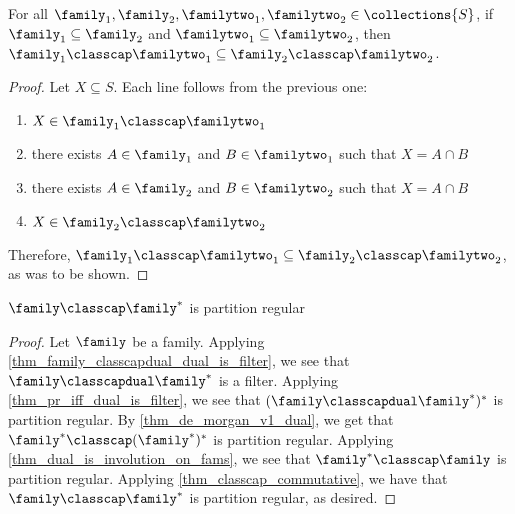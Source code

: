 \begin{theorem}
    \label{thm_classcap_monotone}
    For all $\family_1, \family_2, \familytwo_1, \familytwo_2 \in \collections{S}$, if $\family_1 \subseteq \family_2$ and $\familytwo_1 \subseteq \familytwo_2$, then $\family_1 \classcap \familytwo_1 \subseteq \family_2 \classcap \familytwo_2$.
\end{theorem}

\begin{proof}


     Let $X \subseteq S$.  Each line follows from the previous one:
    \begin{enumerate}
        \item $X \in \family_1 \classcap \familytwo_1$
        \item there exists $A \in \family_1$ and $B \in \familytwo_1$ such that $X = A \cap B$
        \item there exists $A \in \family_2$ and $B \in \familytwo_2$ such that $X = A \cap B$
        \item $X \in \family_2 \classcap \familytwo_2$
    \end{enumerate}
    Therefore, $\family_1 \classcap \familytwo_1 \subseteq \family_2 \classcap \familytwo_2$, as was to be shown.
\end{proof}

\begin{theorem}
    \label{thm_family_classcap_dual_is_partition_regular}
    $\family \classcap \family^*$ is partition regular
\end{theorem}

\begin{proof}
    Let $\family$ be a family. Applying \cref{thm_family_classcapdual_dual_is_filter}, we see that $\family \classcapdual \family^*$ is a filter.  Applying \cref{thm_pr_iff_dual_is_filter}, we see that $(\family \classcapdual \family^*)^*$ is partition regular.  By \cref{thm_de_morgan_v1_dual}, we get that $\family^* \classcap (\family^*)^*$ is partition regular.  Applying \cref{thm_dual_is_involution_on_fams}, we see that $\family^* \classcap \family$ is partition regular.  Applying \cref{thm_classcap_commutative}, we have that $\family \classcap \family^*$ is partition regular, as desired.
\end{proof}

